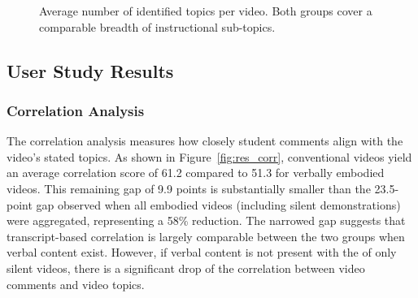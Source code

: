 \documentclass[fleqn,10pt]{JLA_article} %
\begin{document}
\begin{figure}[h!]
    \centering
    \caption{Average number of identified topics per video. Both groups cover a comparable breadth of instructional sub-topics.}
    \label{fig:res_topics}
\end{figure}

\subsection{User Study Results}

\subsubsection{Correlation Analysis}
The correlation analysis measures how closely student comments align with the video's stated topics. As shown in Figure~\ref{fig:res_corr}, conventional videos yield an average correlation score of 61.2 compared to 51.3 for verbally embodied videos. This remaining gap of 9.9 points is substantially smaller than the 23.5-point gap observed when all embodied videos (including silent demonstrations) were aggregated, representing a 58\% reduction. The narrowed gap suggests that transcript-based correlation is largely comparable between the two groups when verbal content exist. However, if verbal content is not present with the of only silent videos, there is a significant drop of the correlation between video comments and video topics.
\end{document}
